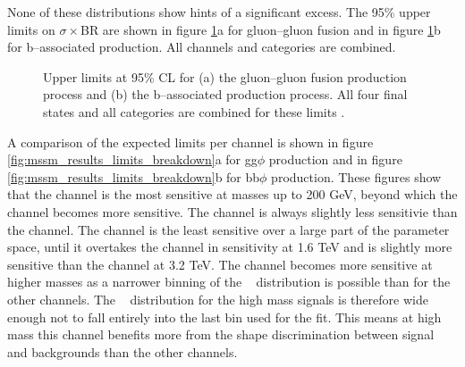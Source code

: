 None of these distributions show hints of a significant excess. The
95\% upper limits on $\sigma\times$BR are shown in figure \ref{fig:mssm_results_limits}a
for gluon--gluon fusion and in figure \ref{fig:mssm_results_limits}b for b--associated
production. All channels and categories are combined. 
\begin{figure}[h!]
\begin{center}
\end{center}
\caption{Upper limits at 95\% CL for (a) the gluon--gluon fusion production
process and (b) the b--associated production process. All four final states and 
all categories are combined for these limits \cite{CMS-PAS-HIG-16-037}.}
\label{fig:mssm_results_limits}
\end{figure}

A comparison of the expected limits
per channel is shown in figure \ref{fig:mssm_results_limits_breakdown}a for gg$\phi$ production
and in figure \ref{fig:mssm_results_limits_breakdown}b for bb$\phi$ production.
These figures show that the \mutau channel is the most sensitive at masses up to 
200 GeV, beyond which the \tautau channel becomes more sensitive. The \etau
channel is always slightly less sensitivie than the \mutau channel. The \emu channel
is the least sensitive over a large part of the parameter space, until it overtakes the 
\etau channel in sensitivity at 1.6 TeV and is slightly more sensitive than the
\mutau channel at 3.2 TeV. The \emu channel becomes more sensitive at higher masses as
a narrower binning of the \mTtot~ distribution is possible than for the other channels.
The \mTtot~ distribution for the high mass signals is therefore wide enough not to
fall entirely into the last bin used for the fit. This means at high mass this channel
benefits more from the shape discrimination between signal and backgrounds than
the other channels.

